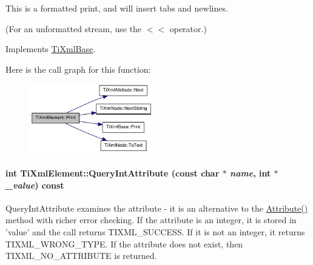 This is a formatted print, and will insert tabs and newlines.

(For an unformatted stream, use the $<$$<$ operator.) 

Implements \hyperlink{class_ti_xml_base_a0de56b3f2ef14c65091a3b916437b512}{TiXmlBase}.

Here is the call graph for this function:\nopagebreak
\begin{figure}[H]
\begin{center}
\leavevmode
\includegraphics[width=152pt]{class_ti_xml_element_ad9d0c008866982ab8d9aafae7e14d692_cgraph}
\end{center}
\end{figure}
\hypertarget{class_ti_xml_element_aea0bfe471380f281c5945770ddbf52b9}{
\paragraph[{QueryIntAttribute}]{\setlength{\rightskip}{0pt plus 5cm}int TiXmlElement::QueryIntAttribute (const char $\ast$ {\em name}, \/  int $\ast$ {\em \_\-value}) const}\hfill}
\label{class_ti_xml_element_aea0bfe471380f281c5945770ddbf52b9}
QueryIntAttribute examines the attribute -\/ it is an alternative to the \hyperlink{class_ti_xml_element_ac1e4691e9375ba4e665dce7e46a50a9c}{Attribute()} method with richer error checking. If the attribute is an integer, it is stored in 'value' and the call returns TIXML\_\-SUCCESS. If it is not an integer, it returns TIXML\_\-WRONG\_\-TYPE. If the attribute does not exist, then TIXML\_\-NO\_\-ATTRIBUTE is returned. 

